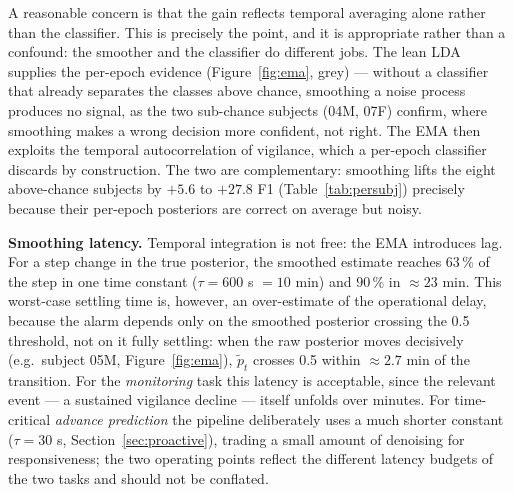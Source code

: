 \documentclass[journal]{IEEEtran}
\begin{document}
A reasonable concern is that the gain reflects temporal averaging alone rather than the classifier. This is precisely the point, and it is appropriate rather than a confound: the smoother and the classifier do different jobs. The lean LDA supplies the per-epoch evidence (Figure~\ref{fig:ema}, grey) --- without a classifier that already separates the classes above chance, smoothing a noise process produces no signal, as the two sub-chance subjects (04M, 07F) confirm, where smoothing makes a wrong decision more confident, not right. The EMA then exploits the temporal autocorrelation of vigilance, which a per-epoch classifier discards by construction. The two are complementary: smoothing lifts the eight above-chance subjects by \(+5.6\) to \(+27.8\) F1 (Table~\ref{tab:persubj}) precisely because their per-epoch posteriors are correct on average but noisy.

\textbf{Smoothing latency.} Temporal integration is not free: the EMA introduces lag. For a step change in the true posterior, the smoothed estimate reaches \(63\,\%\) of the step in one time constant (\(\tau = 600\) s \(=10\) min) and \(90\,\%\) in \(\approx 23\) min. This worst-case settling time is, however, an over-estimate of the operational delay, because the alarm depends only on the smoothed posterior crossing the 0.5 threshold, not on it fully settling: when the raw posterior moves decisively (e.g.\ subject 05M, Figure~\ref{fig:ema}), \(\tilde{p}_t\) crosses 0.5 within \(\approx 2.7\) min of the transition. For the \emph{monitoring} task this latency is acceptable, since the relevant event --- a sustained vigilance decline --- itself unfolds over minutes. For time-critical \emph{advance prediction} the pipeline deliberately uses a much shorter constant (\(\tau = 30\) s, Section~\ref{sec:proactive}), trading a small amount of denoising for responsiveness; the two operating points reflect the different latency budgets of the two tasks and should not be conflated.
\end{document}
